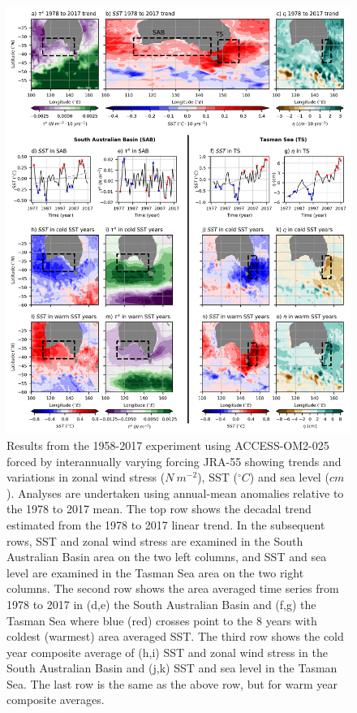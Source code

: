 \documentclass[draft,linenumbers]{agujournal2018}
\begin{document}
\begin{figure}[!h]
\centering
\includegraphics[trim={0 0.25cm 0 0},clip, width=1\textwidth]{c08_fig2_.png}
\caption{Results from the 1958-2017 experiment using ACCESS-OM2-025 forced by interannually varying forcing JRA-55 showing trends and variations in zonal wind stress ($N\ m^{-2}$), SST ($^{\circ}C$) and sea level ($cm$). Analyses are undertaken using annual-mean anomalies relative to the 1978 to 2017 mean. The top row shows the decadal trend estimated from the 1978 to 2017 linear trend. In the subsequent rows, SST and zonal wind stress are examined in the South Australian Basin area on the two left columns, and SST and sea level are examined in the Tasman Sea area on the two right columns. The second row shows the area averaged time series from 1978 to 2017 in (d,e) the South Australian Basin and (f,g) the Tasman Sea where blue (red) crosses point to the 8 years with coldest (warmest) area averaged SST. The third row shows the cold year composite average of (h,i) SST and zonal wind stress in the South Australian Basin and (j,k) SST and sea level in the Tasman Sea. The last row is the same as the above row, but for warm year composite averages.}\label{c08_fig1_}
\end{figure}
\end{document}
